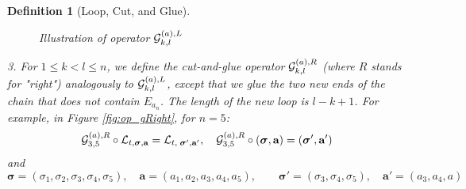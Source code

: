 \documentclass[10pt,reqno]{article}
\theoremstyle{plain} %
\newtheorem{definition}[theorem]{Definition}
\theoremstyle{remark}
\numberwithin{equation}{section}
\begin{document}
\begin{definition}[Loop, Cut, and Glue]
\begin{figure}[ht]
{
    }
        \caption{Illustration of operator ${\cal G}^{(a), L}_{k, l}$}
        \label{fig:op_gLeft}
    \end{figure}

  \noindent 
 \emph{3.} For $1 \le k < l \le n$, we define the cut-and-glue operator ${\cal G}^{(a), R}_{k, l}$ (where $R$ stands for "right") analogously to ${\cal G}^{(a), L}_{k, l}$, except that we glue the two new ends of the chain that does not contain $E_{a_n}$. The length of the new loop is $l-k+1$. For example, in Figure \ref{fig:op_gRight}, for $n=5$:
      $$
    {\cal G}^{(a), R}_{3, 5} \circ {\cal L}_{t, \boldsymbol{\sigma}, \textbf{a}} = {\cal L}_{t, \; \boldsymbol{\sigma}', \textbf{a}'}, \quad 
     {\cal G}^{(a), R}_{3, 5}\circ\left(\boldsymbol{\sigma}, \textbf{a}\right)=\left(\boldsymbol{\sigma}', \textbf{a}'\right)
    $$
   and  $$
  \boldsymbol{\sigma}=(\sigma_1,\sigma_2,\sigma_3,\sigma_4,\sigma_5),\quad 
   \textbf{a}= (a_1,a_2,a_3,a_4,a_5),\quad \quad   \boldsymbol{\sigma}' = (\sigma_3, \sigma_4, \sigma_5), \quad \textbf{a}' = (a_3, a_4, a)
    $$
    \begin{figure}[ht]
        \centering
\end{figure}
\end{definition}
\end{document}
